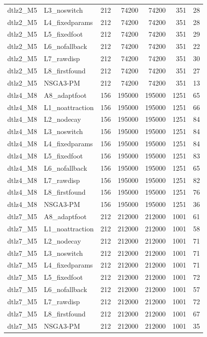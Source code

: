 \begin{tabular}{llrrrrr}
dtlz2_M5 & L3_noswitch & 212 & 74200 & 74200 & 351 & 28 \\
dtlz2_M5 & L4_fixedparams & 212 & 74200 & 74200 & 351 & 28 \\
dtlz2_M5 & L5_fixedfoot & 212 & 74200 & 74200 & 351 & 29 \\
dtlz2_M5 & L6_nofallback & 212 & 74200 & 74200 & 351 & 22 \\
dtlz2_M5 & L7_rawdisp & 212 & 74200 & 74200 & 351 & 30 \\
dtlz2_M5 & L8_firstfound & 212 & 74200 & 74200 & 351 & 27 \\
dtlz2_M5 & NSGA3-PM & 212 & 74200 & 74200 & 351 & 13 \\
dtlz4_M8 & A8_adaptfoot & 156 & 195000 & 195000 & 1251 & 65 \\
dtlz4_M8 & L1_noattraction & 156 & 195000 & 195000 & 1251 & 66 \\
dtlz4_M8 & L2_nodecay & 156 & 195000 & 195000 & 1251 & 84 \\
dtlz4_M8 & L3_noswitch & 156 & 195000 & 195000 & 1251 & 84 \\
dtlz4_M8 & L4_fixedparams & 156 & 195000 & 195000 & 1251 & 84 \\
dtlz4_M8 & L5_fixedfoot & 156 & 195000 & 195000 & 1251 & 83 \\
dtlz4_M8 & L6_nofallback & 156 & 195000 & 195000 & 1251 & 65 \\
dtlz4_M8 & L7_rawdisp & 156 & 195000 & 195000 & 1251 & 82 \\
dtlz4_M8 & L8_firstfound & 156 & 195000 & 195000 & 1251 & 76 \\
dtlz4_M8 & NSGA3-PM & 156 & 195000 & 195000 & 1251 & 36 \\
dtlz7_M5 & A8_adaptfoot & 212 & 212000 & 212000 & 1001 & 61 \\
dtlz7_M5 & L1_noattraction & 212 & 212000 & 212000 & 1001 & 58 \\
dtlz7_M5 & L2_nodecay & 212 & 212000 & 212000 & 1001 & 71 \\
dtlz7_M5 & L3_noswitch & 212 & 212000 & 212000 & 1001 & 71 \\
dtlz7_M5 & L4_fixedparams & 212 & 212000 & 212000 & 1001 & 71 \\
dtlz7_M5 & L5_fixedfoot & 212 & 212000 & 212000 & 1001 & 72 \\
dtlz7_M5 & L6_nofallback & 212 & 212000 & 212000 & 1001 & 57 \\
dtlz7_M5 & L7_rawdisp & 212 & 212000 & 212000 & 1001 & 72 \\
dtlz7_M5 & L8_firstfound & 212 & 212000 & 212000 & 1001 & 67 \\
dtlz7_M5 & NSGA3-PM & 212 & 212000 & 212000 & 1001 & 35 \\
\bottomrule
\end{tabular}
